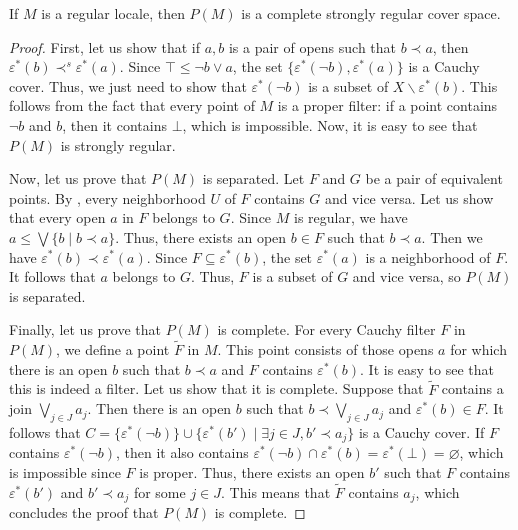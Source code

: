 \documentclass[reqno]{amsart}
\theoremstyle{definition}
\theoremstyle{remark}
\numberwithin{figure}{section}
\newcommand{\rb}{\prec}
\begin{document}
\begin{prop}
If $M$ is a regular locale, then $P(M)$ is a complete strongly regular cover space.
\end{prop}
\begin{proof}
First, let us show that if $a,b$ is a pair of opens such that $b \rb a$, then $\varepsilon^*(b) \rb^s \varepsilon^*(a)$.
Since $\top \leq \neg b \vee a$, the set $\{ \varepsilon^*(\neg b), \varepsilon^*(a) \}$ is a Cauchy cover.
Thus, we just need to show that $\varepsilon^*(\neg b)$ is a subset of $X \backslash \varepsilon^*(b)$.
This follows from the fact that every point of $M$ is a proper filter: if a point contains $\neg b$ and $b$, then it contains $\bot$, which is impossible.
Now, it is easy to see that $P(M)$ is strongly regular.

Now, let us prove that $P(M)$ is separated.
Let $F$ and $G$ be a pair of equivalent points.
By , every neighborhood $U$ of $F$ contains $G$ and vice versa.
Let us show that every open $a$ in $F$ belongs to $G$.
Since $M$ is regular, we have $a \leq \bigvee \{ b \mid b \rb a \}$.
Thus, there exists an open $b \in F$ such that $b \rb a$.
Then we have $\varepsilon^*(b) \rb \varepsilon^*(a)$.
Since $F \subseteq \varepsilon^*(b)$, the set $\varepsilon^*(a)$ is a neighborhood of $F$.
It follows that $a$ belongs to $G$.
Thus, $F$ is a subset of $G$ and vice versa, so $P(M)$ is separated.

Finally, let us prove that $P(M)$ is complete.
For every Cauchy filter $F$ in $P(M)$, we define a point $\widetilde{F}$ in $M$.
This point consists of those opens $a$ for which there is an open $b$ such that $b \rb a$ and $F$ contains $\varepsilon^*(b)$.
It is easy to see that this is indeed a filter.
Let us show that it is complete.
Suppose that $\widetilde{F}$ contains a join $\bigvee_{j \in J} a_j$.
Then there is an open $b$ such that $b \rb \bigvee_{j \in J} a_j$ and $\varepsilon^*(b) \in F$.
It follows that $C = \{ \varepsilon^*(\neg b) \} \cup \{ \varepsilon^*(b') \mid \exists j \in J, b' \rb a_j \}$ is a Cauchy cover.
If $F$ contains $\varepsilon^*(\neg b)$, then it also contains $\varepsilon^*(\neg b) \cap \varepsilon^*(b) = \varepsilon^*(\bot) = \varnothing$, which is impossible since $F$ is proper.
Thus, there exists an open $b'$ such that $F$ contains $\varepsilon^*(b')$ and $b' \rb a_j$ for some $j \in J$.
This means that $\widetilde{F}$ contains $a_j$, which concludes the proof that $P(M)$ is complete.
\end{proof}
\end{document}

